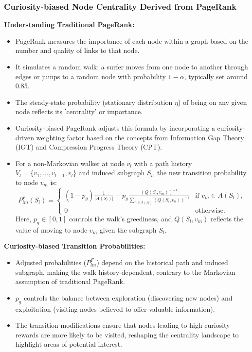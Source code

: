 \documentclass{beamer}
\begin{document}
\begin{frame}
\frametitle{Curiosity-biased Node Centrality Derived from PageRank}

\textbf{Understanding Traditional PageRank:}
\begin{itemize}
    \item PageRank measures the importance of each node within a graph based on the number and quality of links to that node.
    \item It simulates a random walk: a surfer moves from one node to another through edges or jumps to a random node with probability $1-\alpha$, typically set around 0.85.
    \item The steady-state probability (stationary distribution $\eta$) of being on any given node reflects its 'centrality' or importance.
\end{itemize}
\end{frame}

 \begin{frame}
 \begin{itemize}
    \item Curiosity-biased PageRank adjusts this formula by incorporating a curiosity-driven weighting factor based on the concepts from Information Gap Theory (IGT) and Compression Progress Theory (CPT).
    \item For a non-Markovian walker at node $v_l$ with a path history $V_l = \{v_1, \dots, v_{l-1}, v_l\}$ and induced subgraph $S_l$, the new transition probability to node $v_m$ is:
\begin{equation}
P_{lm}^{F}(S_l) = 
\begin{cases} 
(1-p_g)\frac{1}{|A(S_l)|} + p_g \frac{(Q(S_l, v_m))^{-1}}{\sum_{n \in A(S_l)}(Q(S_l, v_n))^{-1}} & \text{if } v_m \in A(S_l), \\
0 & \text{otherwise}.
\end{cases}
\end{equation}
Here, $p_g \in [0, 1]$ controls the walk's greediness, and $Q(S_l, v_m)$ reflects the value of moving to node $v_m$ given the subgraph $S_l$.

\end{itemize}
\end{frame}


 \begin{frame}
\textbf{Curiosity-biased Transition Probabilities:}
\begin{itemize}
    \item Adjusted probabilities ($P_{lm}^{F}$) depend on the historical path and induced subgraph, making the walk history-dependent, contrary to the Markovian assumption of traditional PageRank.
    \item $p_g$ controls the balance between exploration (discovering new nodes) and exploitation (visiting nodes believed to offer valuable information).
    \item The transition modifications ensure that nodes leading to high curiosity rewards are more likely to be visited, reshaping the centrality landscape to highlight areas of potential interest.

\end{itemize}
\end{frame}
\end{document}
